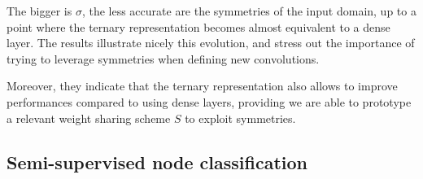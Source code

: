 The bigger is $\sigma$, the less accurate are the symmetries of the input domain, up to a point where the ternary representation becomes almost equivalent to a dense layer. The results illustrate nicely this evolution, and stress out the importance of trying to leverage symmetries when defining new convolutions.

Moreover, they indicate that the ternary representation also allows to improve performances compared to using dense layers, providing we are able to prototype a relevant weight sharing scheme $S$ to exploit symmetries.



\subsection{Semi-supervised node classification}


